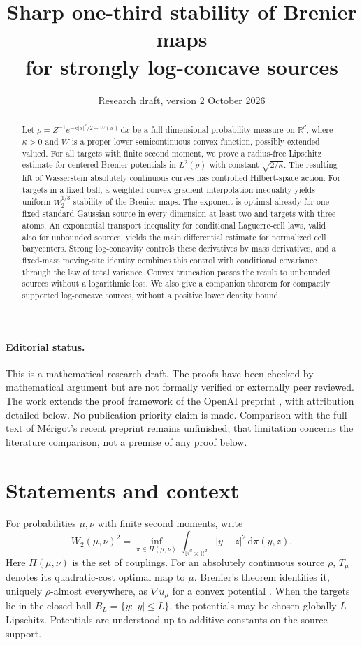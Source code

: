 \documentclass[11pt]{article}
\title{Sharp one-third stability of Brenier maps\\for strongly log-concave sources}
\author{}
\date{Research draft, version 2\quad 7 October 2026}
\numberwithin{equation}{section}
\theoremstyle{remark}
\newcommand{\R}{\mathbb R}
\newcommand{\dd}{\,\mathrm d}
\begin{document}
\maketitle
\vspace{-1.5em}
\begin{abstract}
Let $\rho=Z^{-1}e^{-\kappa|x|^2/2-W(x)}\dd x$ be a full-dimensional probability measure on $\R^d$, where $\kappa>0$ and $W$ is a proper lower-semicontinuous convex function, possibly extended-valued. For all targets with finite second moment, we prove a radius-free Lipschitz estimate for centered Brenier potentials in $L^2(\rho)$ with constant $\sqrt{2/\kappa}$. The resulting lift of Wasserstein absolutely continuous curves has controlled Hilbert-space action. For targets in a fixed ball, a weighted convex-gradient interpolation inequality yields uniform $W_2^{1/3}$ stability of the Brenier maps. The exponent is optimal already for one fixed standard Gaussian source in every dimension at least two and targets with three atoms. An exponential transport inequality for conditional Laguerre-cell laws, valid also for unbounded sources, yields the main differential estimate for normalized cell barycenters. Strong log-concavity controls these derivatives by mass derivatives, and a fixed-mass moving-site identity combines this control with conditional covariance through the law of total variance. Convex truncation passes the result to unbounded sources without a logarithmic loss. We also give a companion theorem for compactly supported log-concave sources, without a positive lower density bound.
\end{abstract}

\paragraph{Editorial status.}
This is a mathematical research draft. The proofs have been checked by mathematical argument but are not formally verified or externally peer reviewed. The work extends the proof framework of the OpenAI preprint \cite{OpenAI2026}, with attribution detailed below. No publication-priority claim is made. Comparison with the full text of M\'erigot's recent preprint \cite{Merigot2026} remains unfinished; that limitation concerns the literature comparison, not a premise of any proof below.

\section{Statements and context}\label{sec:intro}
For probabilities $\mu,\nu$ with finite second moments, write
\[
 W_2(\mu,\nu)^2=\inf_{\pi\in\Pi(\mu,\nu)}
 \int_{\R^d\times\R^d}|y-z|^2\dd\pi(y,z).
\]
Here $\Pi(\mu,\nu)$ is the set of couplings. For an absolutely continuous source $\rho$, $T_\mu$ denotes its quadratic-cost optimal map to $\mu$. Brenier's theorem identifies it, uniquely $\rho$-almost everywhere, as $\nabla u_\mu$ for a convex potential \cite{Brenier1991}. When the targets lie in the closed ball $B_L=\{y:|y|\le L\}$, the potentials may be chosen globally $L$-Lipschitz. Potentials are understood up to additive constants on the source support.
\end{document}
